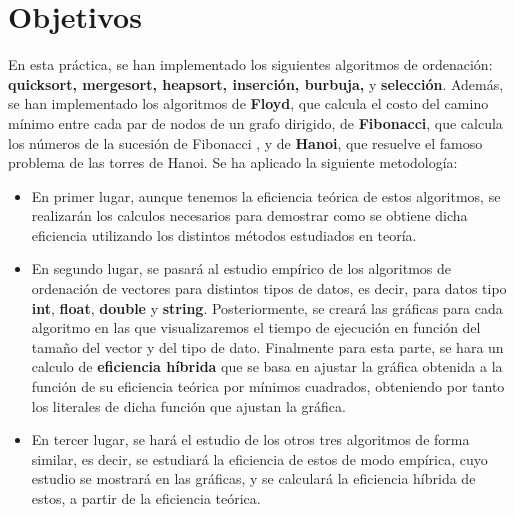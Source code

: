 \documentclass[11pt]{article}
\begin{document}
\section{Objetivos}
    En esta práctica, se han implementado los siguientes algoritmos de ordenación: \textbf{quicksort, mergesort, heapsort, inserción, burbuja,}
    y \textbf{selección}. Además, se han implementado los algoritmos de \textbf{Floyd}, que calcula el costo del camino mínimo entre cada par de nodos 
    de un grafo dirigido, de \textbf{Fibonacci}, que calcula los números de la sucesión de Fibonacci , y de \textbf{Hanoi}, que resuelve el famoso 
    problema de las torres de Hanoi. Se ha aplicado la siguiente metodología:
    \begin{itemize}
        \item En primer lugar, aunque tenemos la eficiencia teórica de estos algoritmos, se realizarán los calculos necesarios para demostrar
        como se obtiene dicha eficiencia utilizando los distintos métodos estudiados en teoría. \\
        
        \item En segundo lugar, se pasará al estudio empírico de los algoritmos de ordenación de vectores para distintos tipos de datos, es decir, 
        para datos tipo \textbf{int}, \textbf{float}, \textbf{double} y \textbf{string}. Posteriormente, se creará las gráficas para
        cada algoritmo en las que visualizaremos el tiempo de ejecución en función del tamaño del vector y del tipo de dato. Finalmente 
        para esta parte, se hara un calculo de \textbf{eficiencia híbrida} que se basa en ajustar la gráfica obtenida a la función de su eficiencia
        teórica por mínimos cuadrados, obteniendo por tanto los literales de dicha función que ajustan la gráfica.\\
        
        \item En tercer lugar, se hará el estudio de los otros tres algoritmos de forma similar, es decir, se estudiará la eficiencia
        de estos de modo empírica, cuyo estudio se mostrará en las gráficas, y se calculará la eficiencia híbrida de estos, a partir
        de la eficiencia teórica.\\     
    \end{itemize}
\end{document}
